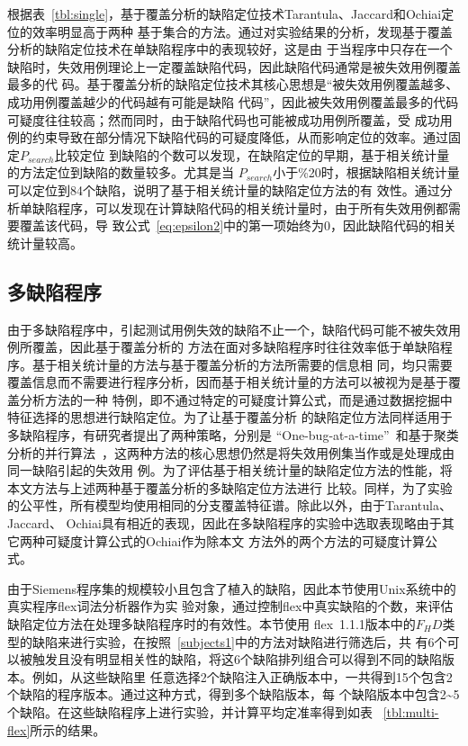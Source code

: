 根据表~\ref{tbl:single}，基于覆盖分析的缺陷定位技术Tarantula、Jaccard和Ochiai定位的效率明显高于两种
基于集合的方法。通过对实验结果的分析，发现基于覆盖分析的缺陷定位技术在单缺陷程序中的表现较好，这是由
于当程序中只存在一个缺陷时，失效用例理论上一定覆盖缺陷代码，因此缺陷代码通常是被失效用例覆盖最多的代
码。基于覆盖分析的缺陷定位技术其核心思想是``被失效用例覆盖越多、成功用例覆盖越少的代码越有可能是缺陷
代码''，因此被失效用例覆盖最多的代码可疑度往往较高；然而同时，由于缺陷代码也可能被成功用例所覆盖，受
成功用例的约束导致在部分情况下缺陷代码的可疑度降低，从而影响定位的效率。通过固定$P_{search}$比较定位
到缺陷的个数可以发现，在缺陷定位的早期，基于相关统计量的方法定位到缺陷的数量较多。尤其是当
$P_{search}$小于\%20时，根据缺陷相关统计量可以定位到84个缺陷，说明了基于相关统计量的缺陷定位方法的有
效性。通过分析单缺陷程序，可以发现在计算缺陷代码的相关统计量时，由于所有失效用例都需要覆盖该代码，导
致公式~\eqref{eq:epsilon2}中的第一项始终为0，因此缺陷代码的相关统计量较高。

\subsection{多缺陷程序}
由于多缺陷程序中，引起测试用例失效的缺陷不止一个，缺陷代码可能不被失效用例所覆盖，因此基于覆盖分析的
方法在面对多缺陷程序时往往效率低于单缺陷程序。基于相关统计量的方法与基于覆盖分析的方法所需要的信息相
同，均只需要覆盖信息而不需要进行程序分析，因而基于相关统计量的方法可以被视为是基于覆盖分析方法的一种
特例，即不通过特定的可疑度计算公式，而是通过数据挖掘中特征选择的思想进行缺陷定位。为了让基于覆盖分析
的缺陷定位方法同样适用于多缺陷程序，有研究者提出了两种策略，分别是
``One-bug-at-a-time''~\cite{klahr1988cognitive}和基于聚类分析的并行算法~\cite{jones2007debugging,
zheng2006statistical}，这两种方法的核心思想仍然是将失效用例集当作或是处理成由同一缺陷引起的失效用
例。为了评估基于相关统计量的缺陷定位方法的性能，将本文方法与上述两种基于覆盖分析的多缺陷定位方法进行
比较。同样，为了实验的公平性，所有模型均使用相同的分支覆盖特征谱。除此以外，由于Tarantula、Jaccard、
Ochiai具有相近的表现，因此在多缺陷程序的实验中选取表现略由于其它两种可疑度计算公式的Ochiai作为除本文
方法外的两个方法的可疑度计算公式。

由于Siemens程序集的规模较小且包含了植入的缺陷，因此本节使用Unix系统中的真实程序flex词法分析器作为实
验对象，通过控制flex中真实缺陷的个数，来评估缺陷定位方法在处理多缺陷程序时的有效性。本节使用
flex~1.1.1版本中的$F_HD$类型的缺陷来进行实验，在按照~\ref{subjects1}中的方法对缺陷进行筛选后，共
有6个可以被触发且没有明显相关性的缺陷，将这6个缺陷排列组合可以得到不同的缺陷版本。例如，从这些缺陷里
任意选择2个缺陷注入正确版本中，一共得到15个包含2个缺陷的程序版本。通过这种方式，得到多个缺陷版本，每
个缺陷版本中包含2\textasciitilde5个缺陷。在这些缺陷程序上进行实验，并计算平均定准率得到如表
~\ref{tbl:multi-flex}所示的结果。

